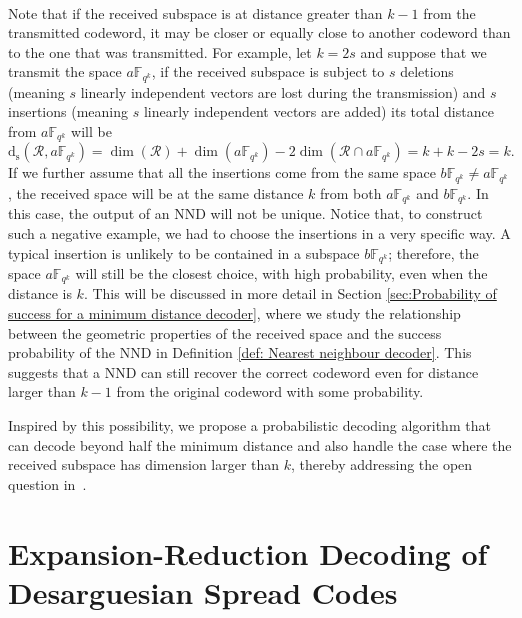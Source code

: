 \documentclass{article}
\newcommand{\Fqk}{\mathbb{F}_{q^k}}
\newcommand{\ds}{\mathrm{d_s}}
\newcommand{\calR}{\mathcal{R}}
\begin{document}
\\
\par Note that if the received subspace is at distance greater than $k-1$ from the transmitted codeword, it may be closer or equally close to another codeword than to the one that was transmitted.
For example, let $k=2s$ and suppose that we transmit the space $a \Fqk$, if the received subspace is subject to $s$ deletions (meaning $s$ linearly independent vectors are lost during the transmission) and $s$ insertions (meaning $s$ linearly independent vectors are added) its total distance from $a \Fqk$ will be $$\ds(\calR,a \Fqk)=\dim(\calR) + \dim(a \Fqk) - 2 \dim(\calR \cap a \Fqk)=k+k-2s=k.$$
If we further assume that all the insertions come from the same space $b \Fqk \neq a \Fqk$, the received space will be at the same distance $k$ from both $a \Fqk$ and $b\Fqk.$ In this case, the output of an NND will not be unique.
Notice that, to construct such a negative example, we had to choose the insertions in a very specific way. A typical insertion is unlikely to be contained in a subspace $b\Fqk$; therefore, the space $a\Fqk$ will still be the closest choice, with high probability, even when the distance is $k$. This will be discussed in more detail in Section \ref{sec:Probability of success for a minimum distance decoder}, where we study the relationship between the geometric properties of the received space and the success probability of the NND in Definition \ref{def: Nearest neighbour decoder}. This suggests that a NND can still recover the correct codeword even for distance larger than $k-1$ from the original codeword with some probability.

Inspired by this possibility, we propose a probabilistic decoding algorithm that can decode beyond half the minimum distance and also handle the case where the received subspace has dimension larger than $k$, thereby addressing the open question in~\cite{Gorla11}.
\section{Expansion-Reduction Decoding of Desarguesian Spread Codes}
\label{sec: ER dec}
\end{document}
